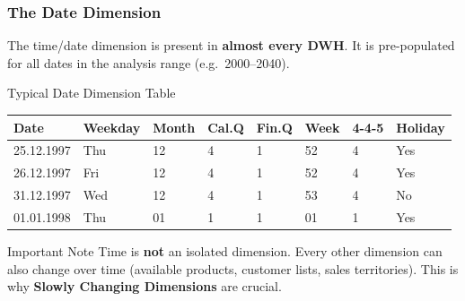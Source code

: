 \begin{frame}
  \frametitle{The Date Dimension}

  The time/date dimension is present in \textbf{almost every DWH}.
  It is pre-populated for all dates in the analysis range (e.g.\ 2000--2040).

  \begin{examples}{Typical Date Dimension Table}
    \scriptsize
    \begin{tabularx}{\linewidth}{@{}l l l l l l l l@{}}
      \toprule
      \textbf{Date}    & \textbf{Weekday} & \textbf{Month} & \textbf{Cal.Q} & \textbf{Fin.Q} & \textbf{Week} & \textbf{4-4-5} & \textbf{Holiday} \\
      \midrule
      25.12.1997 & Thu & 12 & 4 & 1 & 52 & 4 & Yes \\
      26.12.1997 & Fri & 12 & 4 & 1 & 52 & 4 & Yes \\
      31.12.1997 & Wed & 12 & 4 & 1 & 53 & 4 & No \\
      01.01.1998 & Thu & 01 & 1 & 1 & 01 & 1 & Yes \\
      \bottomrule
    \end{tabularx}
    \normalsize
  \end{examples}

  \begin{alertblock}{Important Note}
    Time is \textbf{not} an isolated dimension. Every other dimension
    can also change over time (available products, customer lists, sales territories).
    This is why \textbf{Slowly Changing Dimensions} are crucial.
  \end{alertblock}
\end{frame}


